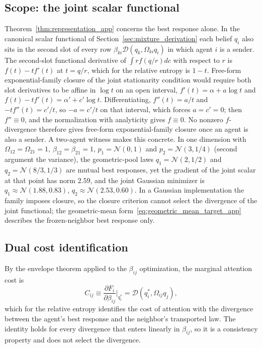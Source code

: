 \subsection*{Scope: the joint scalar functional}
Theorem~\ref{thm:representation_app} concerns the best response alone. In the canonical scalar functional of Section~\ref{sec:mixture_derivation} each belief $q_i$ also sits in the second slot of every row $\beta_{ki}\mathcal{D}(q_k, \Omega_{ki}q_i)$ in which agent $i$ is a sender. The second-slot functional derivative of $\int r f(q/r)dc$ with respect to $r$ is $f(t) - tf'(t)$ at $t = q/r$, which for the relative entropy is $1 - t$. Free-form exponential-family closure of the joint stationarity condition would require both slot derivatives to be affine in $\log t$ on an open interval, $f'(t) = \alpha + a\log t$ and $f(t) - tf'(t) = \alpha' + c'\log t$. Differentiating, $f''(t) = a/t$ and $-tf''(t) = c'/t$, so $-a = c'/t$ on that interval, which forces $a = c' = 0$; then $f'' \equiv 0$, and the normalization with analyticity gives $f \equiv 0$. No nonzero $f$-divergence therefore gives free-form exponential-family closure once an agent is also a sender. A two-agent witness makes this concrete. In one dimension with $\Omega_{12} = \Omega_{21} = 1$, $\beta_{12} = \beta_{21} = 1$, $p_1 = \mathcal{N}(0, 1)$ and $p_2 = \mathcal{N}(3, 1/4)$ (second argument the variance), the geometric-pool laws $q_1 = \mathcal{N}(2, 1/2)$ and $q_2 = \mathcal{N}(8/3, 1/3)$ are mutual best responses, yet the gradient of the joint scalar at that point has norm $2.59$, and the joint Gaussian minimizer is $q_1 \approx \mathcal{N}(1.88, 0.83)$, $q_2 \approx \mathcal{N}(2.53, 0.60)$. In a Gaussian implementation the family imposes closure, so the closure criterion cannot select the divergence of the joint functional; the geometric-mean form~\eqref{eq:geometric_mean_target_app} describes the frozen-neighbor best response only.

\subsection*{Dual cost identification}
By the envelope theorem applied to the $\beta_{ij}$ optimization, the marginal attention cost is
\begin{equation}
C_{ij} \equiv \frac{\partial F_i}{\partial\beta_{ij}}\bigg|_{q_i^*}
= \mathcal{D}(q_i^*,\Omega_{ij}q_j),
\end{equation}
which for the relative entropy identifies the cost of attention with the divergence between the agent's best response and the neighbor's transported law. The identity holds for every divergence that enters linearly in $\beta_{ij}$, so it is a consistency property and does not select the divergence.

